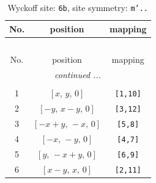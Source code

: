 \documentclass[fleqn,8pt]{jsarticle}
\begin{document}
\begin{longtable}{ccc}
\caption{Wyckoff site: {\tt 6b}, site symmetry: {\tt m'..}}
 \\
 \hline \hline
No. & position & mapping \\ \hline \endfirsthead

\multicolumn{2}{l}{\tablename\ \thetable{}} \\
 \hline \hline
No. & position & mapping \\ \hline \endhead

 \hline \hline
\multicolumn{2}{r}{\footnotesize\it continued ...} \\ \endfoot

 \hline \hline
\multicolumn{2}{r}{} \\ \endlastfoot

1 & $\left[ x,\, y,\, 0 \right]$ & {\tt [1,10]} \\ \hline
2 & $\left[ - y,\, x - y,\, 0 \right]$ & {\tt [3,12]} \\ \hline
3 & $\left[ - x + y,\, - x,\, 0 \right]$ & {\tt [5,8]} \\ \hline
4 & $\left[ - x,\, - y,\, 0 \right]$ & {\tt [4,7]} \\ \hline
5 & $\left[ y,\, - x + y,\, 0 \right]$ & {\tt [6,9]} \\ \hline
6 & $\left[ x - y,\, x,\, 0 \right]$ & {\tt [2,11]} \\
\end{longtable}
\renewcommand{\arraystretch}{1.2}
\end{document}
